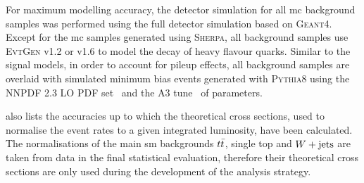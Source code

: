 For maximum modelling accuracy, the detector simulation for all \gls{mc} background samples was performed using the full detector simulation based on \textsc{Geant4}. Except for the \gls{mc} samples generated using \textsc{Sherpa}, all background samples use \textsc{EvtGen} v1.2 or v1.6 to model the decay of heavy flavour quarks. Similar to the signal models, in order to account for pileup effects, all background samples are overlaid with simulated minimum bias events generated with \textsc{Pythia8} using the NNPDF 2.3 LO \gls{PDF} set~\cite{Ball:2012cx} and the A3 tune~\cite{ATL-PHYS-PUB-2016-017} of parameters. 

 also lists the accuracies up to which the theoretical cross sections, used to normalise the event rates to a given integrated luminosity, have been calculated. The normalisations of the main \gls{sm} backgrounds $t\bar{t}$, single top and $W+\mathrm{jets}$ are taken from data in the final statistical evaluation, therefore their theoretical cross sections are only used during the development of the analysis strategy.

